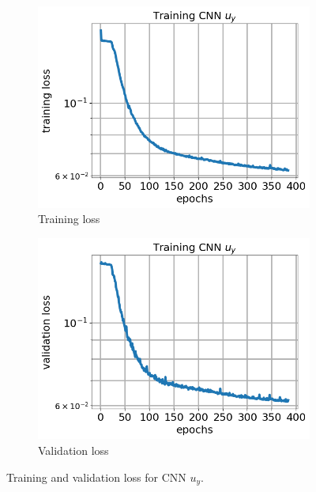 \documentclass[12pt]{article}
\newcommand{\nhgfigheight}{4.0cm}
\begin{document}
\begin{figure}
  \centering
  \begin{subfigure}[b]{0.45\linewidth}
    \includegraphics[totalheight=\nhgfigheight]{Figures/final/training/uy/field_imagesy_plot_loss.png}
    \caption{Training loss}
  \end{subfigure}
  \begin{subfigure}[b]{0.45\linewidth}
    \includegraphics[totalheight=\nhgfigheight]{Figures/final/training/uy/field_imagesy_plot_val_loss.png}
    \caption{Validation loss}
  \end{subfigure}
  \caption{\label{fig:oneinc:trainuy} Training and validation loss for CNN $u_y$.}
\end{figure}
\end{document}
